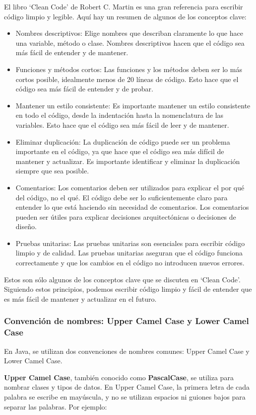\documentclass[executivepaper]{article}
\begin{document}
El libro \enquote*{Clean Code} de Robert C. Martin es una gran referencia para escribir código limpio y legible. Aquí hay un resumen de algunos de los conceptos clave:
\begin{itemize}
    \item Nombres descriptivos: Elige nombres que describan claramente lo que hace una variable, método o clase. Nombres descriptivos hacen que el código sea más fácil de entender y de mantener.
    \item Funciones y métodos cortos: Las funciones y los métodos deben ser lo más cortos posible, idealmente menos de 20 líneas de código. Esto hace que el código sea más fácil de entender y de probar.
    \item Mantener un estilo consistente: Es importante mantener un estilo consistente en todo el código, desde la indentación hasta la nomenclatura de las variables. Esto hace que el código sea más fácil de leer y de mantener.
    \item Eliminar duplicación: La duplicación de código puede ser un problema importante en el código, ya que hace que el código sea más difícil de mantener y actualizar. Es importante identificar y eliminar la duplicación siempre que sea posible.
    \item Comentarios: Los comentarios deben ser utilizados para explicar el por qué del código, no el qué. El código debe ser lo suficientemente claro para entender lo que está haciendo sin necesidad de comentarios. Los comentarios pueden ser útiles para explicar decisiones arquitectónicas o decisiones de diseño.
    \item Pruebas unitarias: Las pruebas unitarias son esenciales para escribir código limpio y de calidad. Las pruebas unitarias aseguran que el código funciona correctamente y que los cambios en el código no introducen nuevos errores.
    \end{itemize}
Estos son sólo algunos de los conceptos clave que se discuten en \enquote*{Clean Code}. Siguiendo estos principios, podemos escribir código limpio y fácil de entender que es más fácil de mantener y actualizar en el futuro.    

\subsubsection*{Convención de nombres: Upper Camel Case y Lower Camel Case}
En Java, se utilizan dos convenciones de nombres comunes: Upper Camel Case y Lower Camel Case.

\textbf{Upper Camel Case}, también conocido como \textbf{PascalCase}, se utiliza para nombrar clases y tipos de datos. En Upper Camel Case, la primera letra de cada palabra se escribe en mayúscula, y no se utilizan espacios ni guiones bajos para separar las palabras. Por ejemplo:
\end{document}
